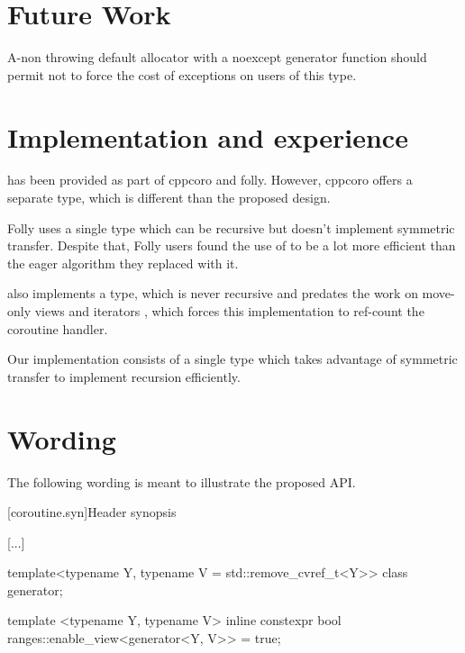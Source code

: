 \documentclass{wg21}
\begin{document}
\section{Future Work}

A-non throwing default allocator with a noexcept generator function should
permit not to force the cost of exceptions on users of this type.  

\section{Implementation and experience}

 has been provided as part of cppcoro and folly.
However, cppcoro offers a separate  type, which is different than the proposed design.

Folly uses a single  type which can be recursive but doesn't implement symmetric transfer. Despite that,
Folly users found the use of  to be a lot more efficient than the eager algorithm they replaced with it.

 also implements a  type, which is never recursive and predates the work on move-only views and
iterators \cite{P1456R1}, \cite{P1207R0} which forces this implementation to ref-count the coroutine handler.

Our implementation \cite{Implementation} consists of a single type which takes advantage of symmetric transfer to implement
recursion efficiently.

\section{Wording}

The following wording is meant to illustrate the proposed API.


[coroutine.syn]{Header  synopsis}

[...]

\begin{codeblock}
    
namespace std {

\end{codeblock}  

\begin{addedblock}
\begin{codeblock}  
template<typename Y, typename V  = std::remove_cvref_t<Y>>
class generator;

template <typename Y, typename V>
inline constexpr bool ranges::enable_view<generator<Y, V>> = true;

\end{codeblock}
\end{addedblock}
\begin{codeblock}
    
}
\end{codeblock}
\end{document}
